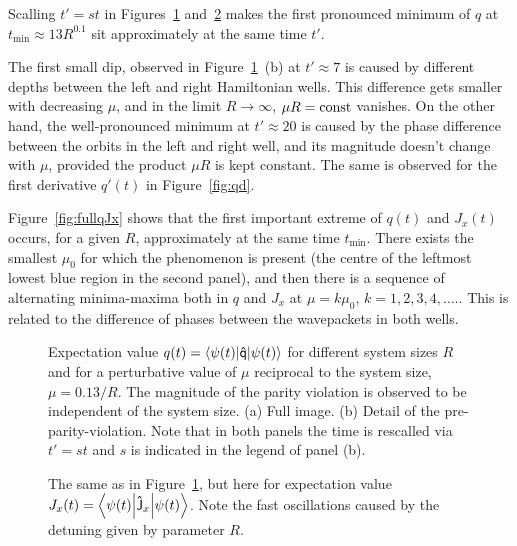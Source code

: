 \documentclass[a4paper,11pt,twoside]{article}
\begin{document}
Scalling $t'=st$ in Figures~\ref{fig:q} and~\ref{fig:Jx} makes the first pronounced minimum of $q$ at $t_{\mathrm{min}}\approx13R^{0.1}$ sit approximately at the same time $t'$.

The first small dip, observed in Figure~\ref{fig:q}~(b) at $t'\approx7$ is caused by different depths between the left and right Hamiltonian wells. 
This difference gets smaller with decreasing $\mu$, and in the limit $R\rightarrow\infty$, $\mu R=\mathrm{const}$ vanishes.
On the other hand, the well-pronounced minimum at $t'\approx20$ is caused by the phase difference between the orbits in the left and right well, and its magnitude doesn't change with $\mu$, provided the product $\mu R$ is kept constant.
The same is observed for the first derivative $q'(t)$ in Figure~\ref{fig:qd}.

Figure~\ref{fig:fullqJx} shows that the first important extreme of $q(t)$ and $J_{x}(t)$ occurs, for a given $R$, approximately at the same time $t_{\mathrm{min}}$.
There exists the smallest $\mu_0$ for which the phenomenon is present (the centre of the leftmost lowest blue region in the second panel), and then there is a sequence of alternating minima-maxima both in $q$ and $J_{x}$ at $\mu=k\mu_{0}$, $k=1,2,3,4,\dotsc.$.
This is related to the difference of phases between the wavepackets in both wells.

\begin{figure}[!h]
        \begin{subfigure}{0.49\linewidth}
            \centering{}
        \end{subfigure}
        \hfill
        \begin{subfigure}{0.49\linewidth}
            \centering{}
        \end{subfigure}
		\caption{Expectation value $q(t)=\left\langle{\psi(t)}\middle|{\mathsf{\hat{q}}}\middle|{\psi(t)}\right\rangle$ for different system sizes $R$ and for a perturbative value of $\mu$ reciprocal to the system size, $\mu=0.13/R$.
		The magnitude of the parity violation is observed to be independent of the system size. (a) Full image. (b) Detail of the pre-parity-violation. 
		Note that in both panels the time is rescalled via $t'=st$ and $s$ is indicated in the legend of panel (b).}
		\label{fig:q}
	\end{figure}   	

	\begin{figure}[!h]
        \begin{subfigure}{0.49\linewidth}
            \centering{}
        \end{subfigure}
        \hfill
        \begin{subfigure}{0.49\linewidth}
            \centering{}
        \end{subfigure}
		\caption{The same as in Figure~\ref{fig:q}, but here for expectation value $J_{x}(t)=\left\langle{\psi(t)}\middle|{\mathsf{\hat{J}}_{x}}\middle|{\psi(t)}\right\rangle$.
		Note the fast oscillations caused by the detuning given by parameter $R$.}
		\label{fig:Jx}
	\end{figure}   	
\end{document}
